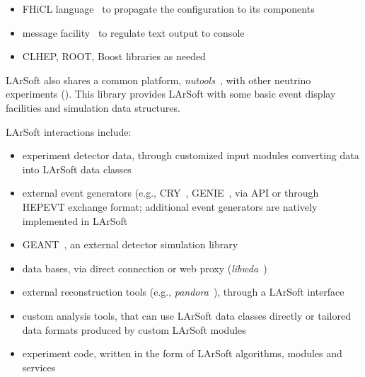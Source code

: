 \begin{itemize}
\item
  FHiCL language~\cite{FHiCL} to propagate the configuration to its
  components
\item
  message facility~\cite{MessageFacility} to regulate text output to console
\item
  CLHEP, ROOT, Boost libraries as needed
\end{itemize}

LArSoft also shares a common platform, \emph{nutools}~\cite{nutools}, with
other neutrino experiments (\NOvA). This library provides LArSoft with
some basic event display facilities and simulation data structures.

LArSoft interactions include:

\begin{itemize}
\item
  experiment detector data, through customized input modules converting
  data into LArSoft data classes
\item
  external event generators (e.g., CRY~\cite{CRY}, GENIE~\cite{GENIE}, via
  API or through HEPEVT exchange format; additional event generators are
  natively implemented in LArSoft
\item
  GEANT~\cite{GEANT}, an external detector simulation library
\item
  data bases, via direct connection or web proxy (\emph{libwda}~\cite{libwda})
\item
  external reconstruction tools (e.g., \emph{pandora}~\cite{pandora}), through a
  LArSoft interface
\item
  custom analysis tools, that can use LArSoft data classes directly or
  tailored data formats produced by custom LArSoft modules
\item
  experiment code, written in the form of LArSoft algorithms, modules
  and services
\end{itemize}

